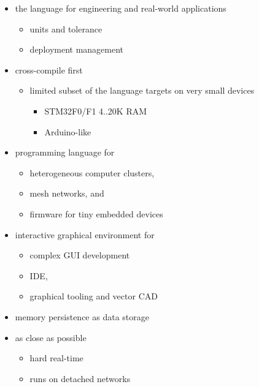 \label{princ}

\begin{itemize}
    \item the language for engineering and real-world applications
    \begin{itemize}
        \item units and tolerance
        \item deployment management
    \end{itemize}
    \item cross-compile first
    \begin{itemize}
        \item limited subset of the language targets on very small devices
        \begin{itemize}
            \item STM32F0/F1 4..20K RAM
            \item Arduino-like
        \end{itemize}
    \end{itemize}
    \item programming language for
    \begin{itemize}
        \item heterogeneous computer clusters,
        \item mesh networks, and
        \item firmware for tiny embedded devices
    \end{itemize}
    \item interactive graphical environment for
    \begin{itemize}
        \item complex GUI development
        \item IDE,
        \item graphical tooling and vector CAD
    \end{itemize}
    \item memory persistence as data storage
    \item as close as possible
    \begin{itemize}
        \item hard real-time
        \item runs on detached networks
    \end{itemize}
\end{itemize}
